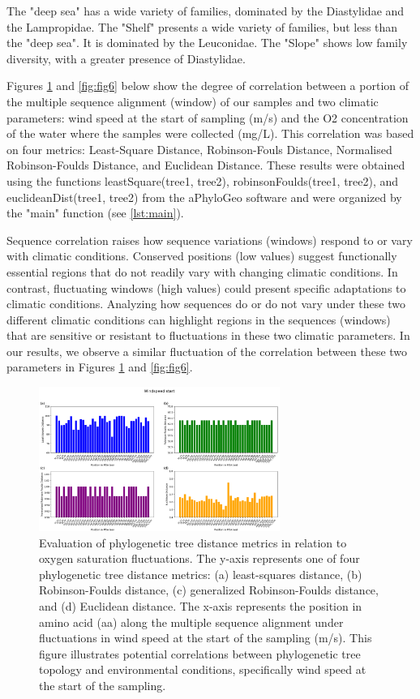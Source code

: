 The "deep sea" has a wide variety of families, dominated by the Diastylidae and the Lampropidae. The "Shelf" presents a wide variety of families, but less than the "deep sea". It is dominated by the Leuconidae. The "Slope" shows low family diversity, with a greater presence of Diastylidae. 

Figures \ref{fig:fig5} and \ref{fig:fig6} below show the degree of correlation between a portion of the multiple sequence alignment (window) of our samples and two climatic parameters: wind speed at the start of sampling (m/s) and the O2 concentration of the water where the samples were collected (mg/L). This correlation was based on four metrics: Least-Square Distance, Robinson-Fouls Distance, Normalised Robinson-Foulds Distance, and Euclidean Distance. These results were obtained using the functions leastSquare(tree1, tree2), robinsonFoulds(tree1, tree2), and euclideanDist(tree1, tree2) from the aPhyloGeo software and were organized by the "main" function (see \autoref{lst:main}). 

Sequence correlation raises how sequence variations (windows) respond to or vary with climatic conditions. Conserved positions (low values) suggest functionally essential regions that do not readily vary with changing climatic conditions. In contrast, fluctuating windows (high values) could present specific adaptations to climatic conditions. Analyzing how sequences do or do not vary under these two different climatic conditions can highlight regions in the sequences (windows) that are sensitive or resistant to fluctuations in these two climatic parameters. In our results, we observe a similar fluctuation of the correlation between these two parameters in Figures \ref{fig:fig5} and \ref{fig:fig6}.

\begin{figure}[]
    \centering
    \includegraphics[width=0.7\textwidth]{figure5.png}
    \caption{Evaluation of phylogenetic tree distance metrics in relation to oxygen saturation fluctuations. The y-axis represents one of four phylogenetic tree distance metrics: (a) least-squares distance, (b) Robinson-Foulds distance, (c) generalized Robinson-Foulds distance, and (d) Euclidean distance. The x-axis represents the position in amino acid (aa) along the multiple sequence alignment under fluctuations in wind speed at the start of the sampling (m/s). This figure illustrates potential correlations between phylogenetic tree topology and environmental conditions, specifically wind speed at the start of the sampling. \label{fig:fig5}}
\end{figure}

